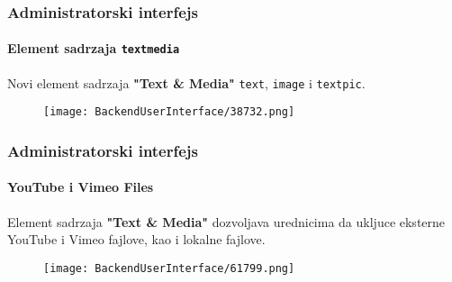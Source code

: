 \begin{frame}[fragile]
	\frametitle{Administratorski interfejs}
	\framesubtitle{Element sadrzaja \texttt{textmedia}}

	Novi element sadrzaja \textbf{"Text \& Media"}
	\texttt{text}, \texttt{image} i \texttt{textpic}.

	\begin{figure}
		\texttt{[image: BackendUserInterface/38732.png]}
	\end{figure}

\end{frame}

\begin{frame}[fragile]
	\frametitle{Administratorski interfejs}
	\framesubtitle{YouTube i Vimeo Files}

	Element sadrzaja \textbf{"Text \& Media"} dozvoljava urednicima da ukljuce eksterne
	YouTube i Vimeo fajlove, kao i lokalne fajlove.

	\begin{figure}
		\texttt{[image: BackendUserInterface/61799.png]}
	\end{figure}

\end{frame}

